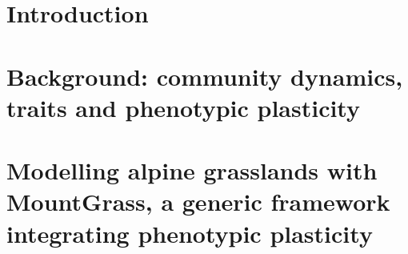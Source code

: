 \documentclass[a4paper, notoc, justified,marginals=left, nobib]{tufte-book}
\begin{document}
\begin{fullwidth}
\cleardoublepage

\tableofcontents

\newpage




\end{fullwidth}
\cleardoublepage



\part{Introduction}\label{part:introduction}
\begin{refsection}


\begin{fullwidth}
\printbibliography[heading=bibliography] 
\end{fullwidth}
\end{refsection}

\part[Background: community dynamics, traits and phenotypic plasticity]{Background: community dynamics,\\traits and phenotypic plasticity}\label{part:literature}
\begin{refsection}
\setcounter{chapter}{0}



\begin{fullwidth}
\printbibliography[heading=bibliography] 
\end{fullwidth}
\end{refsection}


\part[Modelling alpine grasslands with MountGrass, a generic framework integrating phenotypic plasticity]{Modelling alpine grasslands with\\MountGrass, a generic framework\\integrating phenotypic plasticity}\label{part:model}
\setcounter{chapter}{0}
\begin{refsection}

%




\begin{fullwidth}
\printbibliography[heading=bibliography] 
\end{fullwidth}
\end{refsection}
\end{document}
